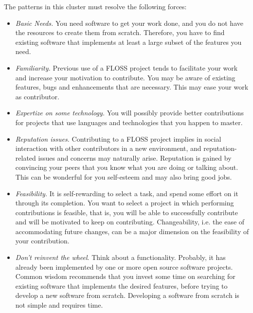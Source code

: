 \documentclass[12pt]{article}
\begin{document}
The patterns in this cluster must resolve the following forces:
\begin{itemize}

\item \textit{Basic Needs.} 
You need software to get your work done, and you do not have the
resources to create them from scratch. Therefore, you have to find existing
software that implements at least a large subset of the features you need.

\item \textit{Familiarity.} 
Previous use of a FLOSS project tends to facilitate your work and increase your motivation to contribute.
You may be aware of existing features, bugs and enhancements that are necessary. 
This may ease your work as contributor.

\item \textit{Expertize on some technology.}
You will possibly provide better contributions for projects that use
languages and technologies that you happen to master.

\item \textit{Reputation issues.}
Contributing to a FLOSS project implies in social interaction with other contributors 
in a new environment, and reputation-related issues and concerns may naturally arise.
Reputation is gained by convincing your peers that you know what 
you are doing or talking about. 
This can be wonderful for you self-esteem and may also bring good jobs.

\item \textit{Feasibility.} It is self-rewarding to select a task, 
and spend some effort on it through its completion.
You want to select a project in which performing contributions is 
feasible, that is,  you will be able to successfully contribute 
and will be motivated to keep on contributing.
Changeability, i.e. the ease of accommodating future changes, 
can be a major dimension on the feasibility of your contribution.

\item\textit{Don't reinvent the wheel}. Think about a functionality. 
Probably, it has already been implemented
by one or more open source software projects. 
Common wisdom recommends that you invest some time on searching
for existing software that implements the desired features, 
before trying to develop a new software from scratch.
Developing a software from scratch is not simple and requires time.

\end{itemize}
\end{document}
